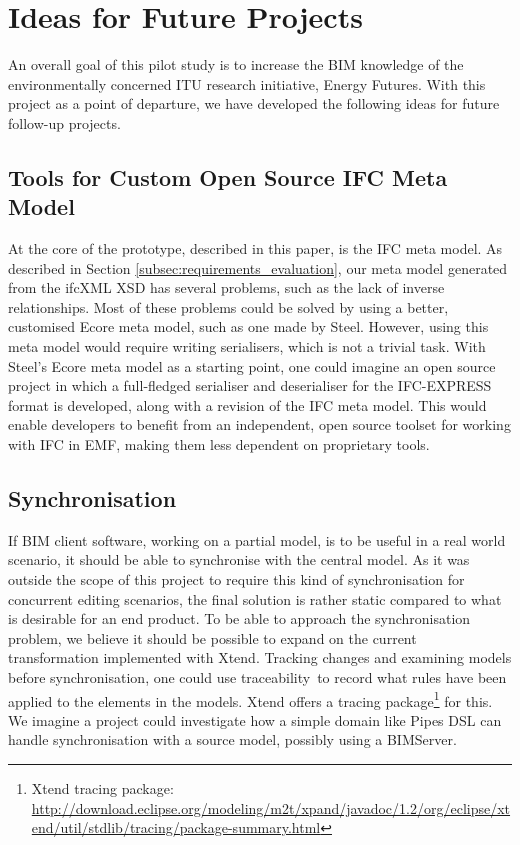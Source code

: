 
\section{Ideas for Future Projects}
\label{sec:plan_for_future_projects}
An overall goal of this pilot study is to increase the BIM knowledge of the environmentally concerned ITU research initiative, Energy Futures. With this project as a point of departure, we have developed the following ideas for future follow-up projects.

\subsection{Tools for Custom Open Source IFC Meta Model}
At the core of the prototype, described in this paper, is the IFC meta model. As described in Section \ref{subsec:requirements_evaluation}, our meta model generated from the ifcXML XSD has several problems, such as the lack of inverse relationships. Most of these problems could be solved by using a better, customised Ecore meta model, such as one made by Steel. However, using this meta model would require writing serialisers, which is not a trivial task. With Steel's Ecore meta model as a starting point, one could imagine an open source project in which a full-fledged serialiser and deserialiser for the IFC-EXPRESS format is developed, along with a revision of the IFC meta model. This would enable developers to benefit from an independent, open source toolset for working with IFC in EMF, making them less dependent on proprietary tools.

\subsection{Synchronisation}
If BIM client software, working on a partial model, is to be useful in a real world scenario, it should be able to synchronise with the central model. As it was outside the scope of this project to require this kind of synchronisation for concurrent editing scenarios, the final solution is rather static compared to what is desirable for an end product. To be able to approach the synchronisation problem, we believe it should be possible to expand on the current transformation implemented with Xtend. Tracking changes and examining models before synchronisation, one could use traceability\,\cite{czarnecki06} to record what rules have been applied to the elements in the models. Xtend offers a tracing package\footnote{Xtend tracing package: \url{http://download.eclipse.org/modeling/m2t/xpand/javadoc/1.2/org/eclipse/xtend/util/stdlib/tracing/package-summary.html}} for this. We imagine a project could investigate how a simple domain like Pipes DSL can handle synchronisation with a source model, possibly using a BIMServer.

